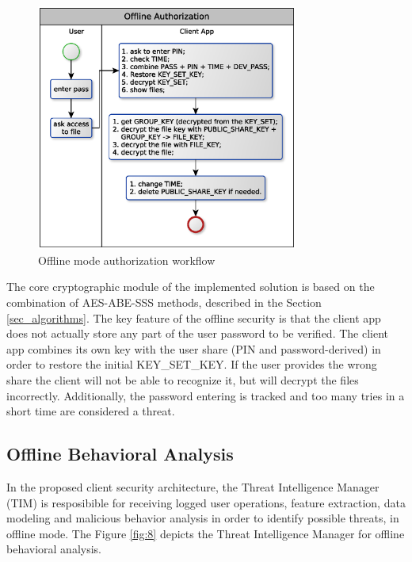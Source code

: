 \documentclass[twocolumn]{svjour3}          %
\begin{document}
\begin{figure}[h!]
	\centering
	\includegraphics[width=8.6cm]{figures/offlineauthorizationworkflow.eps}
	\caption{Offline mode authorization workflow}
	\label{fig:7}
\end{figure}

The core cryptographic module of the implemented solution is based on the combination of AES-ABE-SSS methods, described in the Section \ref{sec_algorithms}. The key feature of the offline security is that the client app does not actually store any part of the user password to be verified. The client app combines its own key with the user share (PIN and password-derived) in order to restore the initial KEY\_SET\_KEY. If the user provides the wrong share the client will not be able to recognize it, but will decrypt the files incorrectly. Additionally, the password entering is tracked and too many tries in a short time are considered a threat.

\subsection{Offline Behavioral Analysis}
\label{sec_offline_behavioral_analysis}

In the proposed client security architecture, the Threat Intelligence Manager (TIM) is resposibible for receiving logged user operations, feature extraction, data modeling and malicious behavior analysis in order to identify possible threats, in offline mode. The Figure \ref{fig:8} depicts the Threat Intelligence Manager for offline behavioral analysis. 
\end{document}
